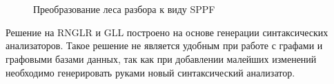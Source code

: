  \begin{figure}[t]
 \centering

    ~\\~
 \caption{Преобразование леса разбора к виду SPPF}
\end{figure}

Решение на RNGLR и GLL построено на основе генерации синтаксических анализаторов. Такое решение не является удобным при работе с графами и графовыми базами данных, так как при добавлении малейших изменений необходимо генерировать руками новый синтаксический анализатор. 

